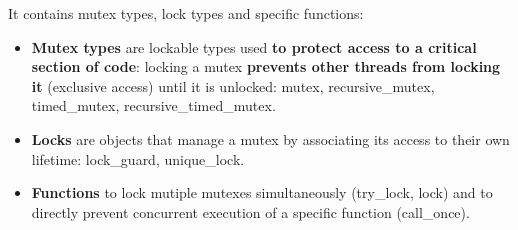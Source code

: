 \documentclass[UTF8,a4paper,12pt]{ctexbook}
\begin{document}
		It contains mutex types, lock types and specific functions:
		\begin{itemize}[itemindent = 1em]
			\item \textbf{Mutex types} are lockable types used \textbf{to protect access to a critical section of code}: locking a mutex\textbf{ prevents other threads from locking it} (exclusive access) until it is unlocked: mutex, recursive\_mutex, timed\_mutex, recursive\_timed\_mutex.
			\item \textbf{Locks} are objects that manage a mutex by associating its access to their own lifetime: lock\_guard, unique\_lock.
			\item \textbf{Functions} to lock mutiple mutexes simultaneously (try\_lock, lock) and to directly prevent concurrent execution of a specific function (call\_once).
		\end{itemize}
		
\end{document}
